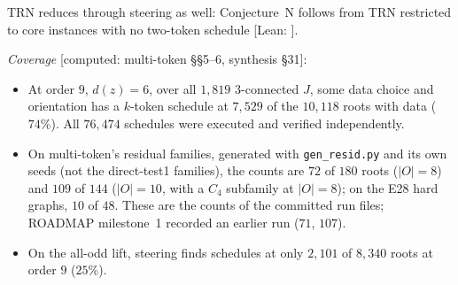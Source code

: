 \documentclass[11pt]{amsart}
\theoremstyle{definition}
\newcommand{\st}[1]{\textsf{\small[#1]}}
\begin{document}
TRN reduces through steering as well: Conjecture~N follows from TRN restricted to core instances with no
two-token schedule \st{Lean: }.

\emph{Coverage} \st{computed: multi-token \S\S5--6, synthesis \S31}:
\begin{itemize}[leftmargin=*]
\item At order $9$, $d(z)=6$, over all $1{,}819$ $3$-connected $J$, some data choice and orientation has
a $k$-token schedule at $7{,}529$ of the $10{,}118$ roots with data ($74\%$). All $76{,}474$ schedules were
executed and verified independently.
\item On multi-token's residual families, generated with \texttt{gen\_resid.py} and its own seeds (not the
direct-test1 families), the counts are $72$ of $180$ roots ($|O|=8$) and $109$ of $144$ ($|O|=10$, with a
$C_4$ subfamily at $|O|=8$); on the E28 hard graphs, $10$ of $48$. These are the counts of the committed
run files; ROADMAP milestone~1 recorded an earlier run ($71$, $107$).
\item On the all-odd lift, steering finds schedules at only $2{,}101$ of $8{,}340$ roots at order $9$
($25\%$).
\end{itemize}
\end{document}
